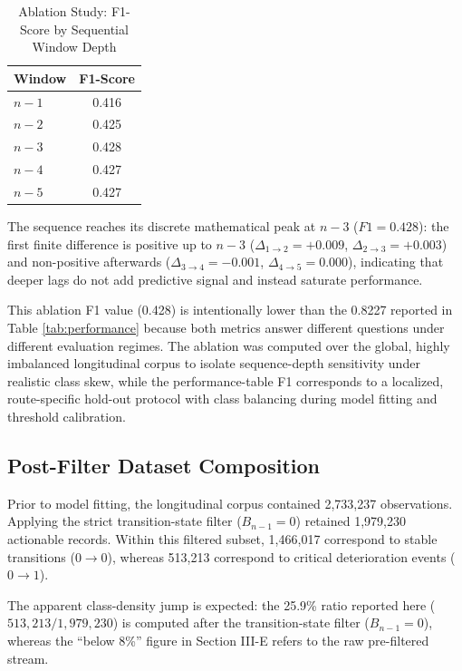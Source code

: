 \documentclass[journal,twocolumn]{IEEEtran}
\def\t{}
\begin{document}
\begin{table}[htbp]
	\t\caption{Ablation Study: F1-Score by Sequential Window Depth}
	\t\centering
	\t\begin{tabular}{@{}lc@{}}
		\t\t\toprule
		\t\t\textbf{Window} & \textbf{F1-Score} \\ \midrule
		\t\t$n-1$           & 0.416             \\
		\t\t$n-2$           & 0.425             \\
		\t\t$n-3$           & 0.428             \\
		\t\t$n-4$           & 0.427             \\
		\t\t$n-5$           & 0.427             \\ \bottomrule
		\t\end{tabular}
	\t\label{tab:ablation}
\end{table}

The sequence reaches its discrete mathematical peak at $n-3$ ($F1=0.428$): the first finite difference is positive up to $n-3$ ($\Delta_{1\rightarrow2}=+0.009$, $\Delta_{2\rightarrow3}=+0.003$) and non-positive afterwards ($\Delta_{3\rightarrow4}=-0.001$, $\Delta_{4\rightarrow5}=0.000$), indicating that deeper lags do not add predictive signal and instead saturate performance.

This ablation F1 value (0.428) is intentionally lower than the 0.8227 reported in Table \ref{tab:performance} because both metrics answer different questions under different evaluation regimes. The ablation was computed over the global, highly imbalanced longitudinal corpus to isolate sequence-depth sensitivity under realistic class skew, while the performance-table F1 corresponds to a localized, route-specific hold-out protocol with class balancing during model fitting and threshold calibration.

\subsection{Post-Filter Dataset Composition}
Prior to model fitting, the longitudinal corpus contained 2,733,237 observations. Applying the strict transition-state filter ($B_{n-1}=0$) retained 1,979,230 actionable records. Within this filtered subset, 1,466,017 correspond to stable transitions ($0 \rightarrow 0$), whereas 513,213 correspond to critical deterioration events ($0 \rightarrow 1$).

The apparent class-density jump is expected: the 25.9\% ratio reported here ($513,213/1,979,230$) is computed after the transition-state filter ($B_{n-1}=0$), whereas the ``below 8\%'' figure in Section III-E refers to the raw pre-filtered stream.
\end{document}
